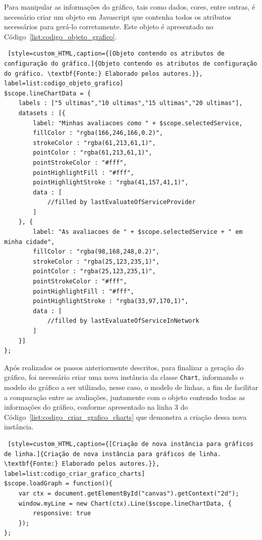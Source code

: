 \par Para manipular as informações do gráfico, tais como dados, cores, entre outras, é necessário criar um objeto em Javascript que contenha todos os atributos necessários para gerá-lo corretamente. Este objeto é apresentado no Código~\ref{list:codigo_objeto_grafico}.

\begin{lstlisting} [style=custom_HTML,caption={[Objeto contendo os atributos de configuração do gráfico.]{Objeto contendo os atributos de configuração do gráfico. \textbf{Fonte:} Elaborado pelos autores.}}, label=list:codigo_objeto_grafico] 	
$scope.lineChartData = {
	labels : ["5 ultimas","10 ultimas","15 ultimas","20 ultimas"],
	datasets : [{
		label: "Minhas avaliacoes como " + $scope.selectedService,
		fillColor : "rgba(166,246,166,0.2)",
		strokeColor : "rgba(61,213,61,1)",
		pointColor : "rgba(61,213,61,1)",
		pointStrokeColor : "#fff",
		pointHighlightFill : "#fff",
		pointHighlightStroke : "rgba(41,157,41,1)",
		data : [
			//filled by lastEvaluateOfServiceProvider
		]   
	}, {
		label: "As avaliacoes de " + $scope.selectedService + " em minha cidade",
		fillColor : "rgba(98,168,248,0.2)",
		strokeColor : "rgba(25,123,235,1)",
		pointColor : "rgba(25,123,235,1)",
		pointStrokeColor : "#fff",
		pointHighlightFill : "#fff",
		pointHighlightStroke : "rgba(33,97,170,1)",
		data : [
			//filled by lastEvaluateOfServiceInNetwork
		]
	}]
};
\end{lstlisting}

\par Após realizados os passos anteriormente descritos, para finalizar a geração do gráfico, foi necessário criar uma nova instância da classe \texttt{Chart}, informando o modelo do gráfico a ser utilizado, nesse caso, o modelo de linhas, a fim de facilitar a comparação entre as avaliações, juntamente com o objeto contendo todas as informações do gráfico, conforme apresentado na linha 3 do Código~\ref{list:codigo_criar_grafico_charts} que demonstra a criação dessa nova instância.

\begin{lstlisting} [style=custom_HTML,caption={[Criação de nova instância para gráficos de linha.]{Criação de nova instância para gráficos de linha. \textbf{Fonte:} Elaborado pelos autores.}}, label=list:codigo_criar_grafico_charts] 	
$scope.loadGraph = function(){
	var ctx = document.getElementById("canvas").getContext("2d");
	window.myLine = new Chart(ctx).Line($scope.lineChartData, {
		responsive: true
	});
};
\end{lstlisting}

